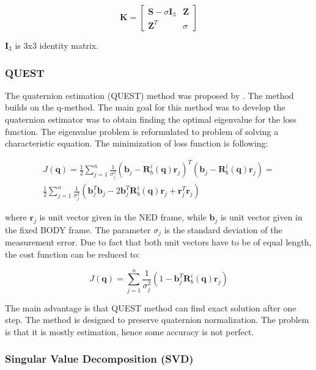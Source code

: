 \documentclass[12pt,a4paper,twoside]{article}
\begin{document}
\begin{equation}
\bm{K} = \begin{bmatrix}
\bm{S} - \sigma\bm{I}_3 & \bm{Z} \\
\bm{Z}^T & \sigma
\end{bmatrix}
\end{equation}

$\bm{I}_3$ is 3x3 identity matrix.

\subsubsection{QUEST}

The quaternion estimation (QUEST) method was proposed by \citet{shuster1978approximate}. The method builds on the q-method. The main goal for this method was to develop the quaternion estimator was to obtain finding the optimal eigenvalue for the loss function. The eigenvalue problem is reformulated to problem of solving a characteristic equation. The minimization of loss function is following:

\begin{equation}
\begin{split}
J(\bm{q}) = \frac{1}{2}\sum_{j=1}^n\frac{1}{\sigma_j^2}(\bm{b}_j - \bm{R}_b^i(\bm{q})\bm{r}_j)^T(\bm{b}_j - \bm{R}_b^i(\bm{q})\bm{r}_j) = \\
\frac{1}{2}\sum_{j=1}^n\frac{1}{\sigma_j^2}(\bm{b}_j^T\bm{b}_j - 2\bm{b}_j^T\bm{R}_b^i(\bm{q})\bm{r}_j + \bm{r}_j^T\bm{r}_j)
\end{split}
\end{equation}

where $\bm{r}_j$ is unit vector given in the NED frame, while $\bm{b}_j$ is unit vector given in the fixed BODY frame. The parameter $\sigma_j$ is the standard deviation of the measurement error. Due to fact that both unit vectors have to be of equal length, the cost function can be reduced to:

\begin{equation}
J(\bm{q}) = \sum_{j=1}^n\frac{1}{\sigma_j^2}(1 - \bm{b}_j^T\bm{R}_b^i(\bm{q})\bm{r}_j)
\end{equation}

The main advantage is that QUEST method can find exact solution after one step. The method is designed to preserve quaternion normalization. The problem is that it is mostly estimation, hence some accuracy is not perfect.

\subsubsection{Singular Value Decomposition (SVD)}
\end{document}
